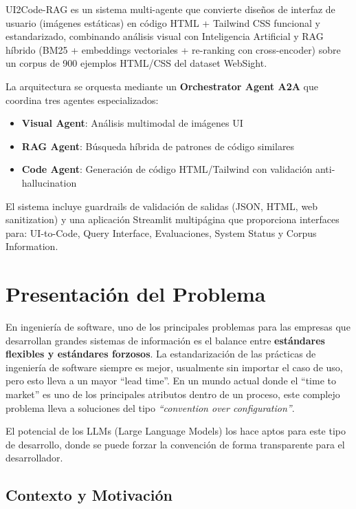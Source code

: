 \documentclass[12pt,a4paper]{article}
\begin{document}
UI2Code-RAG es un sistema multi-agente que convierte diseños de interfaz de usuario (imágenes estáticas) en código HTML + Tailwind CSS funcional y estandarizado, combinando análisis visual con Inteligencia Artificial y RAG híbrido (BM25 + embeddings vectoriales + re-ranking con cross-encoder) sobre un corpus de 900 ejemplos HTML/CSS del dataset WebSight.

La arquitectura se orquesta mediante un \textbf{Orchestrator Agent A2A} que coordina tres agentes especializados:
\begin{itemize}
    \item \textbf{Visual Agent}: Análisis multimodal de imágenes UI
    \item \textbf{RAG Agent}: Búsqueda híbrida de patrones de código similares
    \item \textbf{Code Agent}: Generación de código HTML/Tailwind con validación anti-hallucination
\end{itemize}

El sistema incluye guardrails de validación de salidas (JSON, HTML, web sanitization) y una aplicación Streamlit multipágina que proporciona interfaces para: UI-to-Code, Query Interface, Evaluaciones, System Status y Corpus Information.

\section{Presentación del Problema}

En ingeniería de software, uno de los principales problemas para las empresas que desarrollan grandes sistemas de información es el balance entre \textbf{estándares flexibles y estándares forzosos}. La estandarización de las prácticas de ingeniería de software siempre es mejor, usualmente sin importar el caso de uso, pero esto lleva a un mayor ``lead time''. En un mundo actual donde el ``time to market'' es uno de los principales atributos dentro de un proceso, este complejo problema lleva a soluciones del tipo \textit{``convention over configuration''}. 

El potencial de los LLMs (Large Language Models) los hace aptos para este tipo de desarrollo, donde se puede forzar la convención de forma transparente para el desarrollador.

\subsection{Contexto y Motivación}
\end{document}
